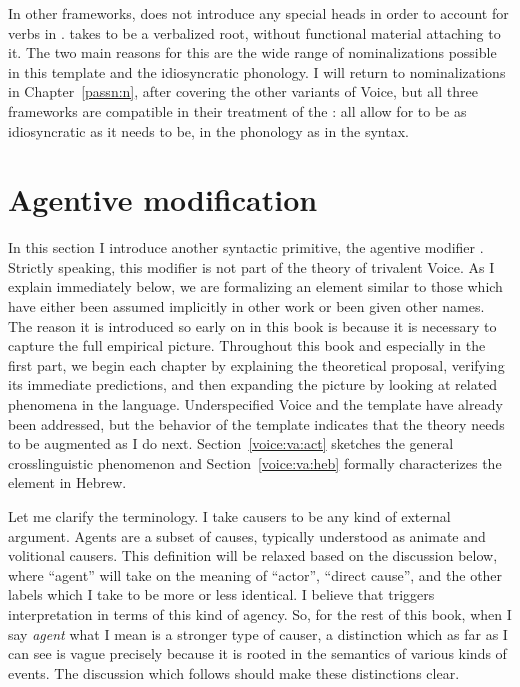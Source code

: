 In other frameworks, \cite{doron03} does not introduce any special heads in order to account for verbs in {\tkal}. \cite{borer13oup,borer15roots} takes {\tkal} to be a verbalized root, without functional material attaching to it. The two main reasons for this are the wide range of nominalizations possible in this template and the idiosyncratic phonology. I will return to nominalizations in Chapter~\ref{passn:n}, after covering the other variants of Voice, but all three frameworks are compatible in their treatment of the {\tkal}: all allow for {\tkal} to be as idiosyncratic as it needs to be, in the phonology as in the syntax.


\section{Agentive modification} \label{voice:va}
In this section I introduce another syntactic primitive, the agentive modifier {\va}. Strictly speaking, this modifier is not part of the theory of trivalent Voice. As I explain immediately below, we are formalizing an element similar to those which have either been assumed implicitly in other work or been given other names. The reason it is introduced so early on in this book is because it is necessary to capture the full empirical picture. Throughout this book and especially in the first part, we begin each chapter by explaining the theoretical proposal, verifying its immediate predictions, and then expanding the picture by looking at related phenomena in the language. Underspecified Voice and the template {\tkal} have already been addressed, but the behavior of the template {\tpie} indicates that the theory needs to be augmented as I do next. Section~\ref{voice:va:act} sketches the general crosslinguistic phenomenon and Section~\ref{voice:va:heb} formally characterizes the element {\va} in Hebrew.

Let me clarify the terminology. I take causers to be any kind of external argument. Agents are a subset of causes, typically understood as animate and volitional causers. This definition will be relaxed based on the discussion below, where ``agent'' will take on the meaning of ``actor'', ``direct cause'', and the other labels which I take to be more or less identical. I believe that {\va} triggers interpretation in terms of this kind of agency. So, for the rest of this book, when I say \emph{agent} what I mean is a stronger type of causer, a distinction which as far as I can see is vague precisely because it is rooted in the semantics of various kinds of events. The discussion which follows should make these distinctions clear.

